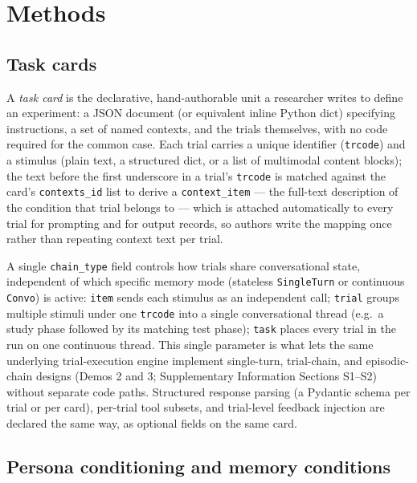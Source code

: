 \documentclass[pdflatex,sn-nature]{sn-jnl}
\begin{document}
\section{Methods}\label{sec:methods}

\subsection{Task cards}\label{sec:methods-taskcard}

A \emph{task card} is the declarative, hand-authorable unit a researcher
writes to define an experiment: a JSON document (or equivalent inline
Python dict) specifying instructions, a set of named contexts, and the
trials themselves, with no code required for the common case. Each trial
carries a unique identifier (\texttt{trcode}) and a stimulus (plain text, a
structured dict, or a list of multimodal content blocks); the text before
the first underscore in a trial's \texttt{trcode} is matched against the
card's \texttt{contexts\_id} list to derive a \texttt{context\_item} —
the full-text description of the condition that trial belongs to — which
is attached automatically to every trial for prompting and for output
records, so authors write the mapping once rather than repeating context
text per trial.

A single \texttt{chain\_type} field controls how trials share conversational
state, independent of which specific memory mode (stateless
\texttt{SingleTurn} or continuous \texttt{Convo}) is active: \texttt{item}
sends each stimulus as an independent call; \texttt{trial} groups multiple
stimuli under one \texttt{trcode} into a single conversational thread (e.g.\
a study phase followed by its matching test phase); \texttt{task} places
every trial in the run on one continuous thread. This single parameter is
what lets the same underlying trial-execution engine implement single-turn,
trial-chain, and episodic-chain designs (Demos 2 and 3; Supplementary
Information Sections S1--S2) without separate code paths.
Structured response parsing (a Pydantic schema per trial or per card),
per-trial tool subsets, and trial-level feedback injection are declared the
same way, as optional fields on the same card.

\subsection{Persona conditioning and memory
conditions}\label{sec:methods-conditions}
\end{document}
